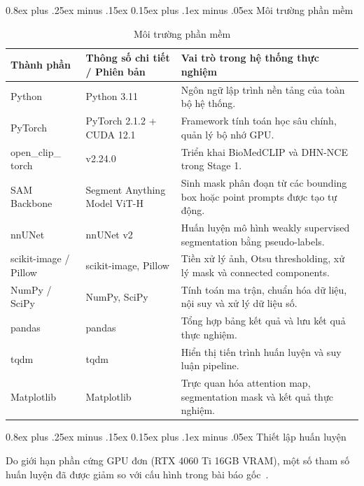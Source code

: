 \documentclass[conference]{IEEEtran}
\makeatletter
\def\subsection{\@startsection{subsection}{2}{\z@}%
  {0.8ex plus .25ex minus .15ex}%
  {0.15ex plus .1ex minus .05ex}%
  {\reset@font\normalsize\itshape}}%
\makeatother
\begin{document}
\subsection{Môi trường phần mềm}
\begin{table}[H]
\centering
\footnotesize
\setlength{\tabcolsep}{3pt}
\caption{Môi trường phần mềm}
\label{tab:software}
\begin{tabular}{|>{\raggedright\arraybackslash}p{}|>{\raggedright\arraybackslash}p{}|>{\raggedright\arraybackslash}p{}|}
\hline
\textbf{Thành phần} & \textbf{Thông số chi tiết / Phiên bản} & \textbf{Vai trò trong hệ thống thực nghiệm} \\
\hline
Python & Python 3.11 & Ngôn ngữ lập trình nền tảng của toàn bộ hệ thống. \\
\hline
PyTorch & PyTorch 2.1.2 + CUDA 12.1 & Framework tính toán học sâu chính, quản lý bộ nhớ GPU. \\
\hline
\makecell[l]{open\_clip\_\\torch} & v2.24.0 & Triển khai BioMedCLIP và DHN-NCE trong Stage 1. \\
\hline
SAM Backbone & Segment Anything Model ViT-H & Sinh mask phân đoạn từ các bounding box hoặc point prompts được tạo tự động. \\
\hline
nnUNet & nnUNet v2 & Huấn luyện mô hình weakly supervised segmentation bằng pseudo-labels. \\
\hline
scikit-image / Pillow & scikit-image, Pillow & Tiền xử lý ảnh, Otsu thresholding, xử lý mask và connected components. \\
\hline
NumPy / SciPy & NumPy, SciPy & Tính toán ma trận, chuẩn hóa dữ liệu, nội suy và xử lý dữ liệu số. \\
\hline
pandas & pandas & Tổng hợp bảng kết quả và lưu kết quả thực nghiệm. \\
\hline
tqdm & tqdm & Hiển thị tiến trình huấn luyện và suy luận pipeline. \\
\hline
Matplotlib & Matplotlib & Trực quan hóa attention map, segmentation mask và kết quả thực nghiệm. \\
\hline
\end{tabular}
\end{table}

\subsection{Thiết lập huấn luyện}

Do giới hạn phần cứng GPU đơn (RTX 4060 Ti 16GB VRAM), một số tham số huấn luyện đã được giảm so với cấu hình trong bài báo gốc~\cite{ref1}.
\end{document}
